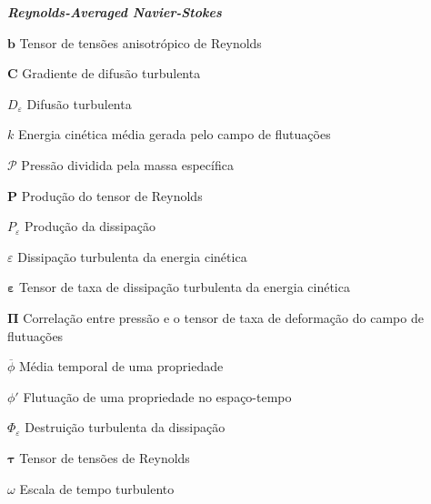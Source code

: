 \documentclass[12pt,
	openright,	%
	twoside,    %
	a4paper,			%
	sumario=tradicional,
	english,			%
	french, 			%
	brazil				%
]{USPSC}
\renewcommand{\bar}[1]{\overline{#1}}
\newcommand{\script}[1]{\mathcal{#1}}
\newcommand{\BB}[1]{\mathbf{#1}}
\newcommand{\ep}{\varepsilon}
\begin{document}
\begin{simbolos}
    \item[\textbf{\textit{Reynolds-Averaged Navier-Stokes}}]
    \item[$\BB{b}$] Tensor de tensões anisotrópico de Reynolds
    \item[$\BB{C}$] Gradiente de difusão turbulenta
    \item[$D_\ep$] Difusão turbulenta
    \item[$k$] Energia cinética média gerada pelo campo de flutuações
    \item[$\script{P}$] Pressão dividida pela massa específica
    \item[$\BB{P}$] Produção do tensor de Reynolds
    \item[$P_\ep$] Produção da dissipação
    \item[$\ep$] Dissipação turbulenta da energia cinética
    \item[$\BB{\ep}$] Tensor de taxa de dissipação turbulenta da energia cinética
    \item[$\BB{\Pi}$] Correlação entre pressão e o tensor de taxa de deformação do campo de flutuações
    \item[$\bar{\phi}$] Média temporal de uma propriedade
    \item[$\phi'$] Flutuação de uma propriedade no espaço-tempo
    \item[$\Phi_\ep$] Destruição turbulenta da dissipação
    \item[$\BB{\tau}$] Tensor de tensões de Reynolds
    \item[$\omega$] Escala de tempo turbulento
\end{simbolos}

\tableofcontents*
\cleardoublepage

\textual

\renewcommand\chaptername{}







\postextual


\end{document}
